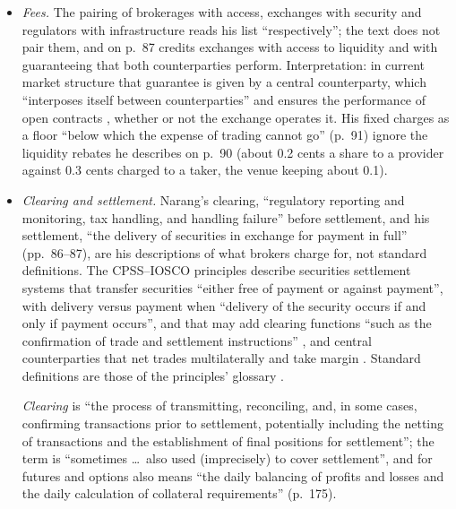\begin{qfdefinition}
\begin{itemize}
Lower latency reduces slippage by shortening the delay (p.~88), and higher volatility raises it (pp.~88 and~91); interpretation: with no expected drift over the delay, a longer delay or a higher volatility widens the spread of outcomes rather than raising their mean, and raises the expected cost only together with an adverse drift, such as an accurate short-term forecast that the market starts to price, which is his own condition (p.~88). His GOOG figure, an average daily range 16 times the average day-to-day move, is undated and unsourced.
\item \emph{Fees.} The pairing of brokerages with access, exchanges with security and regulators with infrastructure reads his list ``respectively''; the text does not pair them, and on p.~87 credits exchanges with access to liquidity and with guaranteeing that both counterparties perform. Interpretation: in current market structure that guarantee is given by a central counterparty, which ``interposes itself between counterparties'' and ensures the performance of open contracts \citep[para.~1.13, p.~9]{exp-pfmi}, whether or not the exchange operates it. His fixed charges as a floor ``below which the expense of trading cannot go'' (p.~91) ignore the liquidity rebates he describes on p.~90 (about 0.2 cents a share to a provider against 0.3 cents charged to a taker, the venue keeping about 0.1).
\item \emph{Clearing and settlement.} Narang's clearing, ``regulatory reporting and monitoring, tax handling, and handling failure'' before settlement, and his settlement, ``the delivery of securities in exchange for payment in full'' (pp.~86--87), are his descriptions of what brokers charge for, not standard definitions. The CPSS--IOSCO principles describe securities settlement systems that transfer securities ``either free of payment or against payment'', with delivery versus payment when ``delivery of the security occurs if and only if payment occurs'', and that may add clearing functions ``such as the confirmation of trade and settlement instructions'' \citep[para.~1.12, p.~8]{exp-pfmi}, and central counterparties that net trades multilaterally and take margin \citep[para.~1.13, p.~9]{exp-pfmi}. Standard definitions are those of the principles' glossary \citep[Annex~H, pp.~174--178]{exp-pfmi}.

\emph{Clearing} is ``the process of transmitting, reconciling, and, in some cases, confirming transactions prior to settlement, potentially including the netting of transactions and the establishment of final positions for settlement''; the term is ``sometimes \dots\ also used (imprecisely) to cover settlement'', and for futures and options also means ``the daily balancing of profits and losses and the daily calculation of collateral requirements'' (p.~175).


\end{itemize}
\end{qfdefinition}
